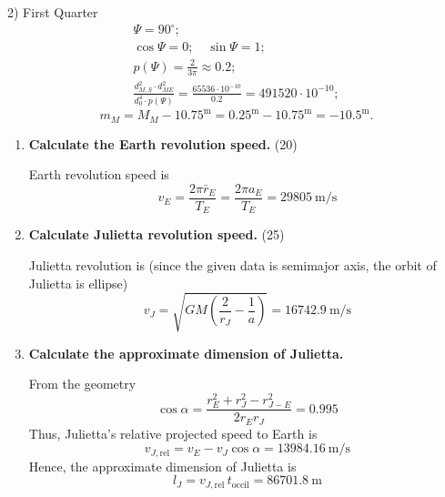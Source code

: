 2) First Quarter
\begin{gather*}
\Psi = 90^\circ;\\
\cos\Psi = 0;\quad \sin\Psi = 1;\\
p(\Psi) = \frac{2}{3\pi} \approx 0.2;\\
\frac{d_{M,S}^{2}\cdot d_{ME}^{2}}{d_{0}^{4}\cdot p(\Psi)}
  = \frac{65536\cdot10^{-10}}{0.2} = 491520\cdot10^{-10};
\end{gather*}
\[
m_{M} = M_{M} - 10.75^{\mathrm{m}} = 0.25^{\mathrm{m}} - 10.75^{\mathrm{m}}
      = -10.5^{\mathrm{m}}.
\]

\begin{enumerate}
\item \textbf{Calculate the Earth revolution speed.} \hfill(20)

  Earth revolution speed is
  \[
  v_E = \frac{2\pi \bar r_E}{T_E} = \frac{2\pi a_E}{T_E} = 29805~\mathrm{m/s}
  \]
\item \textbf{Calculate Julietta revolution speed.} \hfill(25)

  Julietta revolution is (since the given data is semimajor axis, the orbit of
  Julietta is ellipse)
  \[
  v_J = \sqrt{GM\left(\frac{2}{r_J} - \frac{1}{a}\right)} = 16742.9~\mathrm{m/s}
  \]
\item \textbf{Calculate the approximate dimension of Julietta.}

  From the geometry
  \[
  \cos\alpha = \frac{r_E^2 + r_J^2 - r_{J-E}^2}{2 r_E r_J} = 0.995
  \]
  Thus, Julietta's relative projected speed to Earth is
  \[
  v_{J,\mathrm{rel}} = v_E - v_J\cos\alpha = 13984.16~\mathrm{m/s} \tag*{(40)}
  \]
  Hence, the approximate dimension of Julietta is
  \[
  l_J = v_{J,\mathrm{rel}}\,t_{\mathrm{occil}} = 86701.8~\mathrm{m} \tag*{(15)}
  \]
\end{enumerate}

